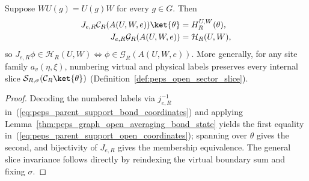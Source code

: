 \begin{lemma}%
    \label{thm:peps_parent_support_open_coordinates}
    \leanok
    Suppose $WU(g)=U(g)W$ for every $g\in G$. Then
    \begin{align}
        J_{e,R}\mathcal C_R(A(U,W,e))\ket{\theta}
                                      & =H_R^{U,W}(\theta), \\
        J_{e,R}\mathcal G_R(A(U,W,e)) & =\mathcal H_R(U,W),
        \label{eq:peps_parent_support_open_coordinates}
    \end{align}
    so $J_{e,R}\phi\in\mathcal H_R(U,W)\iff\phi\in\mathcal G_R(A(U,W,e))$.
    More generally, for any site family $a_v(\eta,\xi)$, numbering virtual and
    physical labels preserves every internal slice
    $\mathcal S_{R,\sigma}(\mathcal C_R\ket{\theta})$
    (Definition~\ref{def:peps_open_sector_slice}).
\end{lemma}
\begin{proof}\leanok
    Decoding the numbered labels via $j_{e,R}^{-1}$ in~(\ref{eq:peps_parent_support_bond_coordinates})
    and applying Lemma~\ref{thm:peps_graph_open_averaging_bond_state} yields
    the first equality in~(\ref{eq:peps_parent_support_open_coordinates});
    spanning over $\theta$ gives the second, and bijectivity of $J_{e,R}$ gives
    the membership equivalence. The general slice invariance follows directly
    by reindexing the virtual boundary sum and fixing $\sigma$.
\end{proof}


